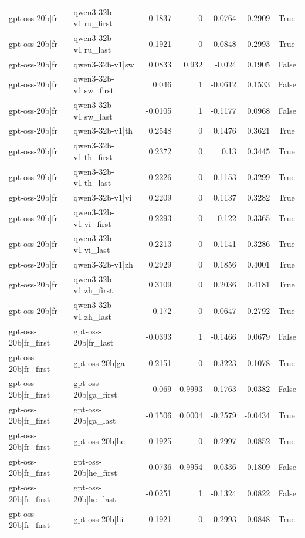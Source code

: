 \begin{table}
\begin{tabular}{l l r r r r l}
gpt-oss-20b|fr & qwen3-32b-v1|ru_first & 0.1837 & 0 & 0.0764 & 0.2909 & True \\
gpt-oss-20b|fr & qwen3-32b-v1|ru_last & 0.1921 & 0 & 0.0848 & 0.2993 & True \\
gpt-oss-20b|fr & qwen3-32b-v1|sw & 0.0833 & 0.932 & -0.024 & 0.1905 & False \\
gpt-oss-20b|fr & qwen3-32b-v1|sw_first & 0.046 & 1 & -0.0612 & 0.1533 & False \\
gpt-oss-20b|fr & qwen3-32b-v1|sw_last & -0.0105 & 1 & -0.1177 & 0.0968 & False \\
gpt-oss-20b|fr & qwen3-32b-v1|th & 0.2548 & 0 & 0.1476 & 0.3621 & True \\
gpt-oss-20b|fr & qwen3-32b-v1|th_first & 0.2372 & 0 & 0.13 & 0.3445 & True \\
gpt-oss-20b|fr & qwen3-32b-v1|th_last & 0.2226 & 0 & 0.1153 & 0.3299 & True \\
gpt-oss-20b|fr & qwen3-32b-v1|vi & 0.2209 & 0 & 0.1137 & 0.3282 & True \\
gpt-oss-20b|fr & qwen3-32b-v1|vi_first & 0.2293 & 0 & 0.122 & 0.3365 & True \\
gpt-oss-20b|fr & qwen3-32b-v1|vi_last & 0.2213 & 0 & 0.1141 & 0.3286 & True \\
gpt-oss-20b|fr & qwen3-32b-v1|zh & 0.2929 & 0 & 0.1856 & 0.4001 & True \\
gpt-oss-20b|fr & qwen3-32b-v1|zh_first & 0.3109 & 0 & 0.2036 & 0.4181 & True \\
gpt-oss-20b|fr & qwen3-32b-v1|zh_last & 0.172 & 0 & 0.0647 & 0.2792 & True \\
gpt-oss-20b|fr_first & gpt-oss-20b|fr_last & -0.0393 & 1 & -0.1466 & 0.0679 & False \\
gpt-oss-20b|fr_first & gpt-oss-20b|ga & -0.2151 & 0 & -0.3223 & -0.1078 & True \\
gpt-oss-20b|fr_first & gpt-oss-20b|ga_first & -0.069 & 0.9993 & -0.1763 & 0.0382 & False \\
gpt-oss-20b|fr_first & gpt-oss-20b|ga_last & -0.1506 & 0.0004 & -0.2579 & -0.0434 & True \\
gpt-oss-20b|fr_first & gpt-oss-20b|he & -0.1925 & 0 & -0.2997 & -0.0852 & True \\
gpt-oss-20b|fr_first & gpt-oss-20b|he_first & 0.0736 & 0.9954 & -0.0336 & 0.1809 & False \\
gpt-oss-20b|fr_first & gpt-oss-20b|he_last & -0.0251 & 1 & -0.1324 & 0.0822 & False \\
gpt-oss-20b|fr_first & gpt-oss-20b|hi & -0.1921 & 0 & -0.2993 & -0.0848 & True \\

\end{tabular}
\end{table}

